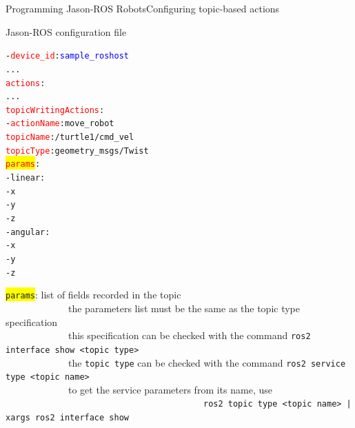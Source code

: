 \documentclass[compress]{beamer}
\newcommand{\yamlkey}[1]{\textcolor{red}{\texttt{#1}}}
\newcommand{\yamlvalue}[1]{\textcolor{blue}{\texttt{#1}}}
\begin{document}
\begin{frame}[fragile]{Programming Jason-ROS Robots}{Configuring topic-based actions}{}


\footnotesize

\begin{block}{Jason-ROS configuration file}


\scriptsize
\begin{alltt}\ssmall
- \yamlkey{device_id}: \yamlvalue{sample_roshost}
     ...
  \yamlkey{actions}:        
        ...
    \yamlkey{topicWritingActions}:          
      - \yamlkey{actionName}: move_robot
        \yamlkey{topicName}: /turtle1/cmd_vel
        \yamlkey{topicType}: geometry_msgs/Twist 
        \colorbox{yellow}{\yamlkey{params}}:
           - linear:
              - x
              - y
              - z
           - angular:
              - x
              - y
              - z     
\end{alltt}
    
\end{block}  

\scriptsize

 \colorbox{yellow}{\texttt{params}}: list of fields recorded in the topic\\
 
  
 
 \vspace{-.45cm}
 \ \ \ \ \ \ \ \ \ \ \ \ \ {\tiny the parameters list must be the same as the topic type specification}\\ 
 
 \vspace{-.45cm}
 \ \ \ \ \ \ \ \ \ \ \ \ \  {\tiny this specification can be checked with the command \texttt{ros2 interface show <topic type>}}\\
 
 \vspace{-.45cm}
 \ \ \ \ \ \ \ \ \ \ \ \ \  {\tiny the \texttt{topic type} can be checked with the command \texttt{ros2 service type <topic name>}} \\
 
  \vspace{-.45cm}
 \ \ \ \ \ \ \ \ \ \ \ \ \  {\tiny to get the service parameters from its name, use}\\
 
 \vspace{-.45cm}
 \ \ \ \ \ \ \ \ \ \ \ \ \ \ \ \ \ \ \ \ \ \ \ \ \ \ \ \ \ \ \ \ \ \ \ \ \ \ \ \ \  {\tiny\texttt{ros2 topic type <topic name> | xargs ros2 interface show}}

\end{frame}
\end{document}
